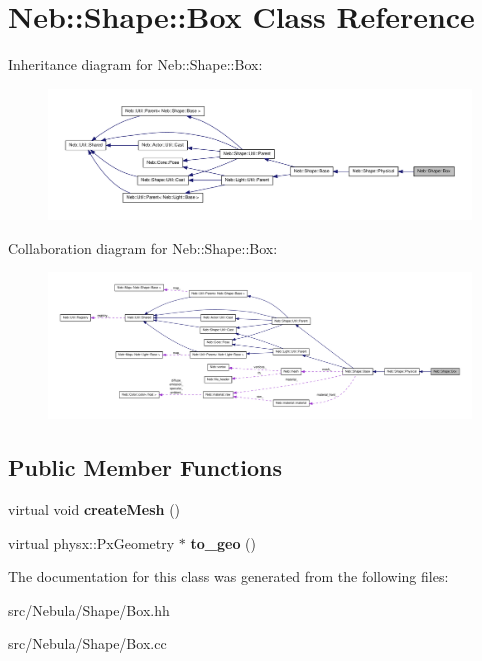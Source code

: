 \hypertarget{classNeb_1_1Shape_1_1Box}{\section{\-Neb\-:\-:\-Shape\-:\-:\-Box \-Class \-Reference}
\label{classNeb_1_1Shape_1_1Box}
}


\-Inheritance diagram for \-Neb\-:\-:\-Shape\-:\-:\-Box\-:\nopagebreak
\begin{figure}[H]
\begin{center}
\leavevmode
\includegraphics[width=350pt]{classNeb_1_1Shape_1_1Box__inherit__graph}
\end{center}
\end{figure}


\-Collaboration diagram for \-Neb\-:\-:\-Shape\-:\-:\-Box\-:\nopagebreak
\begin{figure}[H]
\begin{center}
\leavevmode
\includegraphics[width=350pt]{classNeb_1_1Shape_1_1Box__coll__graph}
\end{center}
\end{figure}
\subsection*{\-Public \-Member \-Functions}
\begin{DoxyCompactItemize}
\item 
\hypertarget{classNeb_1_1Shape_1_1Box_a1d2d6415c411efbaa87a8e97ea98b21b}{virtual void {\bfseries create\-Mesh} ()}\label{classNeb_1_1Shape_1_1Box_a1d2d6415c411efbaa87a8e97ea98b21b}

\item 
\hypertarget{classNeb_1_1Shape_1_1Box_a8a187a785088d678c1b651f3eebd7431}{virtual physx\-::\-Px\-Geometry $\ast$ {\bfseries to\-\_\-geo} ()}\label{classNeb_1_1Shape_1_1Box_a8a187a785088d678c1b651f3eebd7431}

\end{DoxyCompactItemize}


\-The documentation for this class was generated from the following files\-:\begin{DoxyCompactItemize}
\item 
src/\-Nebula/\-Shape/\-Box.\-hh\item 
src/\-Nebula/\-Shape/\-Box.\-cc\end{DoxyCompactItemize}
